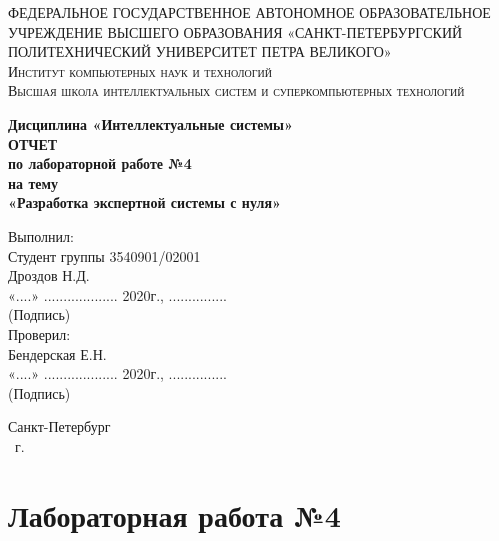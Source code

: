 \documentclass[14pt,a4paper,report]{report}
\begin{document}
\def\contentsname{Содержание}

\begin{titlepage}
	\begin{center}
		\textsc{ФЕДЕРАЛЬНОЕ ГОСУДАРСТВЕННОЕ АВТОНОМНОЕ ОБРАЗОВАТЕЛЬНОЕ УЧРЕЖДЕНИЕ ВЫСШЕГО ОБРАЗОВАНИЯ
«САНКТ-ПЕТЕРБУРГСКИЙ ПОЛИТЕХНИЧЕСКИЙ УНИВЕРСИТЕТ ПЕТРА ВЕЛИКОГО»\\[5mm]
			Институт компьютерных наук и технологий\\
			Высшая школа интеллектуальных систем и суперкомпьютерных технологий}
		
		\vfill
		
		\textbf{Дисциплина «Интеллектуальные системы»\\[10mm]
		ОТЧЕТ\\[2mm]
		по лабораторной работе №4\\[2mm]
		на тему\\[2mm]
			«Разработка экспертной системы с нуля»\\[41mm]
		}
	\end{center}
	
	\hfill
	\begin{minipage}{.4\textwidth}
		Выполнил:\\[2mm] 
        Студент группы 3540901/02001\\
		Дроздов Н.Д.\\[2mm]
        «....» ................... 2020г., ...............\\
        \hspace*{38mm} (Подпись)\\[2mm]
		Проверил:\\[2mm] 
		Бендерская Е.Н.\\[2mm]
		«....» ................... 2020г., ...............\\
        \hspace*{38mm} (Подпись)\\
	\end{minipage}
	\vfill
	\begin{center}
		Санкт-Петербург\\ \the\year\ г.
	\end{center}
\end{titlepage}


\tableofcontents
\clearpage

\chapter{Лабораторная работа №4}
\end{document}
